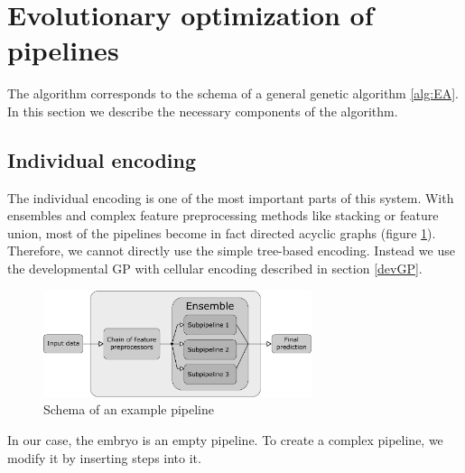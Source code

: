 






\section{Evolutionary optimization of pipelines}
The algorithm corresponds to the schema of a general genetic algorithm
\ref{alg:EA}. In this section we describe the necessary components of the
algorithm.

\subsection{Individual encoding}
The individual encoding is one of the most important parts of this system. With
ensembles and complex feature preprocessing methods like stacking or feature
union, most of the pipelines become in fact directed acyclic graphs (figure 
\ref{pic02:pipeline}). Therefore, we cannot directly use the simple tree-based
encoding. Instead we use the developmental GP with cellular encoding described
in section \ref{devGP}.
\begin{figure}[ht]\centering
\includegraphics[width=0.7\textwidth]{../img/pipeline-pdfa.pdf}
\caption{Schema of an example pipeline}
\label{pic02:pipeline}
\end{figure}

In our case, the embryo is an empty pipeline. To create a complex pipeline, we
modify it by inserting steps into it.

